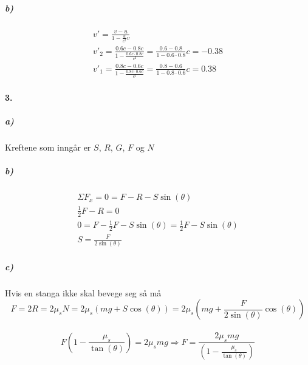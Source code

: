 \documentclass[11pt, A4paper,norsk]{article}
\begin{document}
			\subparagraph{b)}
				\begin{gather*}
v' = \frac{v - u}{1 - \frac{u}{c^2}v} \\
v'_2 = \frac{0.6c - 0.8c}{1 - \frac{0.6c \cdot 0.8c}{c^2}} = \frac{0.6 - 0.8}{1 - 0.6 \cdot 0.8}c = - 0.38 \\
v'_1 = \frac{0.8c - 0.6c}{1 - \frac{0.8c \cdot 0.6c}{c^2}} = \frac{0.8 - 0.6}{1 - 0.8 \cdot 0.6}c = 0.38
				\end{gather*}









		\paragraph{3.}
			\subparagraph{a)}
				\begin{flushleft}
Kreftene som inngår er $S$, $R$, $G$, $F$ og $N$
				\end{flushleft}









			\subparagraph{b)}
				\begin{gather*}
\Sigma F_x = 0 = F - R - S \sin (\theta) \\
\frac{1}{2} F - R = 0 \\
0 = F - \frac{1}{2} F - S \sin (\theta) = \frac{1}{2} F - S \sin (\theta) \\
S = \frac{F}{2 \sin(\theta)}
				\end{gather*}












			\subparagraph{c)}
				\begin{flushleft}
Hvis en stanga ikke skal bevege seg så må
$$F = 2 R = 2 \mu_s N = 2 \mu_s (mg + S \cos(\theta)) = 2 \mu_s \left( mg + \frac{F}{2 \sin(\theta)} \cos(\theta) \right)$$ \\
$$F \left( 1 - \frac{\mu_s}{\tan(\theta)} \right) = 2 \mu_s mg \Rightarrow F = \frac{2 \mu_s mg}{\left( 1 - \frac{\mu_s}{\tan(\theta)} \right)} $$
				\end{flushleft}
\end{document}
